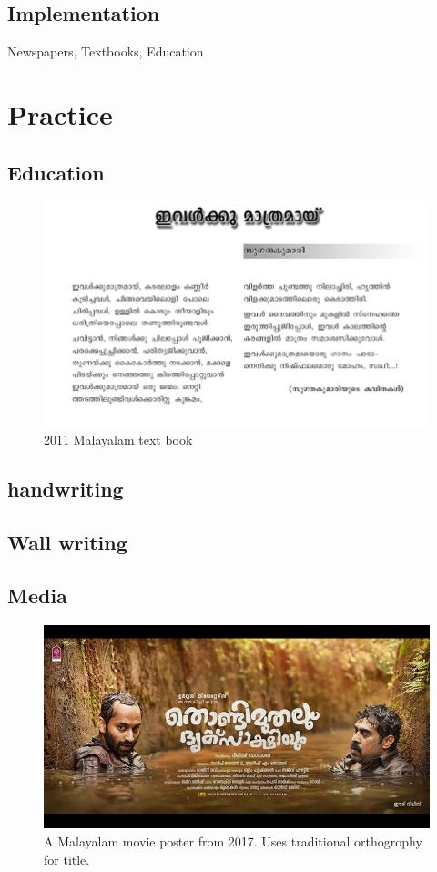 \documentclass[10pt]{article}
\begin{document}
\subsection{Implementation}
Newspapers, Textbooks, Education

\section{Practice}
\subsection{Education}

\begin{figure}
  \centering
   \includegraphics[width=1.0\textwidth]{images/2011-Malayalam-Textbook.png}
     \caption{2011 Malayalam text book}
\end{figure}

\subsection{handwriting}
\subsection{Wall writing}
\subsection{Media}
\begin{figure}
  \centering
   \includegraphics[width=1.0\textwidth]{images/2017-movieposter-Thondimuthal}
  \caption{A Malayalam movie poster from 2017. Uses traditional orthogrophy for title.}
\end{figure}
\end{document}
